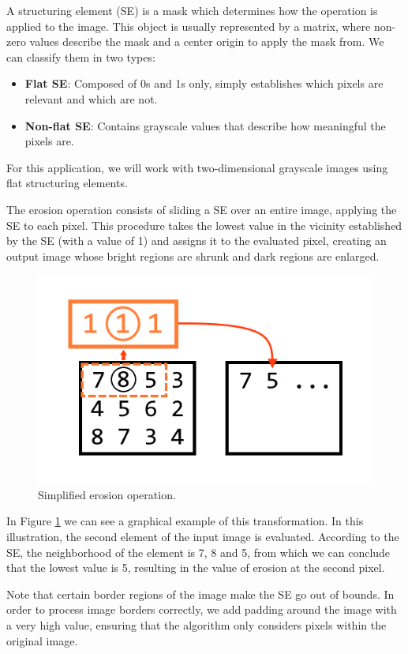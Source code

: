 A structuring element (SE) is a mask which determines how the operation is applied to the image.
This object is usually represented by a matrix, where non-zero values describe the mask and a center origin to apply the mask from.
We can classify them in two types:
\begin{itemize}
    \item \textbf{Flat SE}: Composed of 0s and 1s only, simply establishes which pixels are relevant and which are not.
    \item \textbf{Non-flat SE}: Contains grayscale values that describe how meaningful the pixels are.
\end{itemize}

For this application, we will work with two-dimensional grayscale images using flat structuring elements.

The erosion operation consists of sliding a SE over an entire image, applying the SE to each pixel.
This procedure takes the lowest value in the vicinity established by the SE (with a value of 1) and assigns it to the evaluated pixel, creating an output image whose bright regions are shrunk and dark regions are enlarged.

\begin{figure}[H]
    \centering
    \includegraphics[width=0.5\linewidth]{images/erosion_graph.png}
    \caption{Simplified erosion operation.}
    \label{fig:erosion-graph}
\end{figure}

In Figure \ref{fig:erosion-graph} we can see a graphical example of this transformation.
In this illustration, the second element of the input image is evaluated.
According to the SE, the neighborhood of the element is 7, 8 and 5, from which we can conclude that the lowest value is 5, resulting in the value of erosion at the second pixel.

Note that certain border regions of the image make the SE go out of bounds.
In order to process image borders correctly, we add padding around the image with a very high value, ensuring that the algorithm only considers pixels within the original image.
\pagebreak
